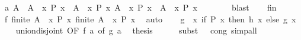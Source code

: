 \begin{isabellebody}
\ a{\isacharcolon}{\kern0pt}\ {\isachardoublequoteopen}A\ {\isacharequal}{\kern0pt}\ A\ {\isasyminter}\ {\isacharbraceleft}{\kern0pt}x{\isachardot}{\kern0pt}\ P\ x{\isacharbraceright}{\kern0pt}\ {\isasymunion}\ A\ {\isasyminter}\ {\isacharminus}{\kern0pt}{\isacharbraceleft}{\kern0pt}x{\isachardot}{\kern0pt}\ P\ x{\isacharbraceright}{\kern0pt}{\isachardoublequoteclose}\ {\isachardoublequoteopen}{\isacharparenleft}{\kern0pt}A\ {\isasyminter}\ {\isacharbraceleft}{\kern0pt}x{\isachardot}{\kern0pt}\ P\ x{\isacharbraceright}{\kern0pt}{\isacharparenright}{\kern0pt}\ {\isasyminter}\ {\isacharparenleft}{\kern0pt}A\ {\isasyminter}\ {\isacharminus}{\kern0pt}{\isacharbraceleft}{\kern0pt}x{\isachardot}{\kern0pt}\ P\ x{\isacharbraceright}{\kern0pt}{\isacharparenright}{\kern0pt}\ {\isacharequal}{\kern0pt}\ {\isacharbraceleft}{\kern0pt}{\isacharbraceright}{\kern0pt}{\isachardoublequoteclose}\isanewline
\ \ \ \ \isamarkupfalse%
\ blast{\isacharplus}{\kern0pt}\isanewline
\ \ \isamarkupfalse%
\ fin\ \isamarkupfalse%
\ f{\isacharcolon}{\kern0pt}\ {\isachardoublequoteopen}finite\ {\isacharparenleft}{\kern0pt}A\ {\isasyminter}\ {\isacharbraceleft}{\kern0pt}x{\isachardot}{\kern0pt}\ P\ x{\isacharbraceright}{\kern0pt}{\isacharparenright}{\kern0pt}{\isachardoublequoteclose}\ {\isachardoublequoteopen}finite\ {\isacharparenleft}{\kern0pt}A\ {\isasyminter}\ {\isacharminus}{\kern0pt}{\isacharbraceleft}{\kern0pt}x{\isachardot}{\kern0pt}\ P\ x{\isacharbraceright}{\kern0pt}{\isacharparenright}{\kern0pt}{\isachardoublequoteclose}\ \isamarkupfalse%
\ auto\isanewline
\ \ \isamarkupfalse%
\ {\isacharquery}{\kern0pt}g\ {\isacharequal}{\kern0pt}\ {\isachardoublequoteopen}{\isasymlambda}x{\isachardot}{\kern0pt}\ if\ P\ x\ then\ h\ x\ else\ g\ x{\isachardoublequoteclose}\isanewline
\ \ \isamarkupfalse%
\ union{\isacharunderscore}{\kern0pt}disjoint\ {\isacharbrackleft}{\kern0pt}OF\ f\ a{\isacharparenleft}{\kern0pt}{}{\isacharparenright}{\kern0pt}{\isacharcomma}{\kern0pt}\ of\ {\isacharquery}{\kern0pt}g{\isacharbrackright}{\kern0pt}\ a{\isacharparenleft}{\kern0pt}{}{\isacharparenright}{\kern0pt}\ \isamarkupfalse%
\ {\isacharquery}{\kern0pt}thesis\isanewline
\ \ \ \ \isamarkupfalse%
\ {\isacharparenleft}{\kern0pt}subst\ {\isacharparenleft}{\kern0pt}{}\ {}{\isacharparenright}{\kern0pt}\ cong{\isacharparenright}{\kern0pt}\ simp{\isacharunderscore}{\kern0pt}all\isanewline
{}\isamarkupfalse%
%
\endisatagproof
{\isafoldproof}%

\end{isabellebody}
